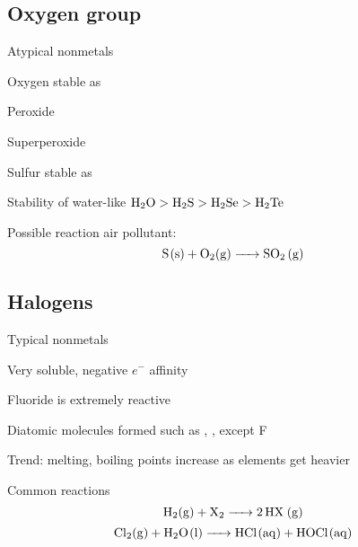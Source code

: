 \begin{mdframed}
\begin{multicols}{2}
\subsection{Oxygen group}
\begin{compactdesc}
\item[Atypical nonmetals]
\item[Oxygen stable as] 
\item[Peroxide] 
\item[Superperoxide] 
\item[Sulfur stable as] 
\item[Stability of water-like] $\ce{H2O} > \ce{H2S} > \ce{H2Se} > \ce{H2Te}$
\item[Possible reaction] air pollutant:
    \[\ce{S(s) + O2(g) -> SO2 (g)}\]
\end{compactdesc}



\subsection{Halogens}
\begin{compactdesc}
\item[Typical] nonmetals
\item[Very] soluble, negative $e^-$ affinity
\item[Fluoride] is extremely reactive
\item[Diatomic] molecules formed such as , , except F
\item[Trend:] melting, boiling points increase as elements get heavier
\item[Common reactions]
    \[\ce{H2(g) + X2 -> 2HX (g)}\]
    \[\ce{Cl2(g) + H2O(l) -> HCl(aq) + HOCl(aq)}\]
\end{compactdesc}


\end{multicols}
\end{mdframed}




